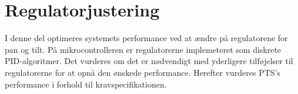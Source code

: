 \part{Regulatorjustering}
I denne del optimeres systemets performance ved at ændre på regulatorene for pan og tilt. 
På mikrocontrolleren er regulatorerne implemeteret som diskrete PID-algoritmer.
Det vurderes om det er nødvendigt med yderligere tilføjelser til regulatorerne 
for at opnå den ønskede performance.
Herefter vurderes PTS's performance i forhold til kravspecifikationen.

%

